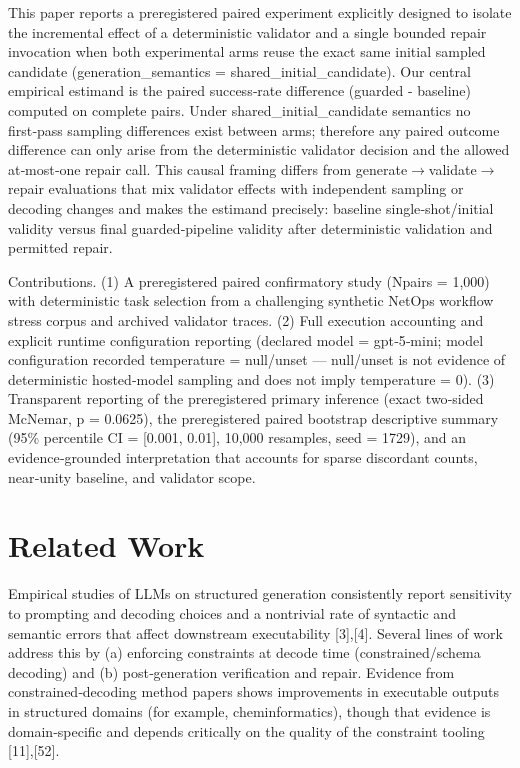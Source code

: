 \documentclass[conference]{IEEEtran}
\begin{document}
This paper reports a preregistered paired experiment explicitly designed to isolate the incremental effect of a deterministic validator and a single bounded repair invocation when both experimental arms reuse the exact same initial sampled candidate (generation\_semantics = shared\_initial\_candidate). Our central empirical estimand is the paired success‑rate difference (guarded - baseline) computed on complete pairs. Under shared\_initial\_candidate semantics no first‑pass sampling differences exist between arms; therefore any paired outcome difference can only arise from the deterministic validator decision and the allowed at‑most‑one repair call. This causal framing differs from generate\ensuremath{\rightarrow}validate\ensuremath{\rightarrow}repair evaluations that mix validator effects with independent sampling or decoding changes and makes the estimand precisely: baseline single‑shot/initial validity versus final guarded‑pipeline validity after deterministic validation and permitted repair.

Contributions. (1) A preregistered paired confirmatory study (Npairs = 1,000) with deterministic task selection from a challenging synthetic NetOps workflow stress corpus and archived validator traces. (2) Full execution accounting and explicit runtime configuration reporting (declared model = gpt‑5‑mini; model configuration recorded temperature = null/unset --- null/unset is not evidence of deterministic hosted‑model sampling and does not imply temperature = 0). (3) Transparent reporting of the preregistered primary inference (exact two‑sided McNemar, p = 0.0625), the preregistered paired bootstrap descriptive summary (95\% percentile CI = [0.001, 0.01], 10,000 resamples, seed = 1729), and an evidence‑grounded interpretation that accounts for sparse discordant counts, near‑unity baseline, and validator scope.

\section{Related Work}
Empirical studies of LLMs on structured generation consistently report sensitivity to prompting and decoding choices and a nontrivial rate of syntactic and semantic errors that affect downstream executability [3],[4]. Several lines of work address this by (a) enforcing constraints at decode time (constrained/schema decoding) and (b) post‑generation verification and repair. Evidence from constrained‑decoding method papers shows improvements in executable outputs in structured domains (for example, cheminformatics), though that evidence is domain‑specific and depends critically on the quality of the constraint tooling [11],[52].
\end{document}
